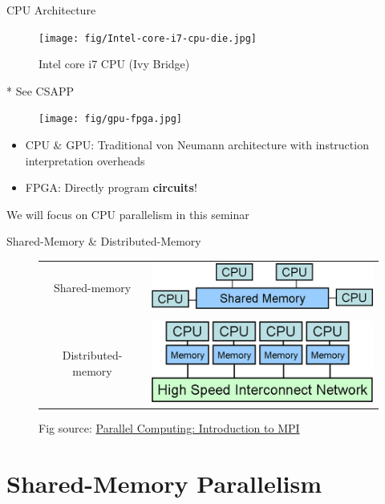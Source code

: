 \documentclass{../TexTemplate/myslide}
\begin{document}
\begin{frame}{CPU Architecture}
\begin{figure}
\centering
\texttt{[image: fig/Intel-core-i7-cpu-die.jpg]}
\caption*{\small Intel core i7 CPU (Ivy Bridge)}
\end{figure}
* See CSAPP
\end{frame}

\begin{frame}
\begin{figure}
\centering
\texttt{[image: fig/gpu-fpga.jpg]}
\end{figure}
\small
\begin{itemize}
\item CPU \& GPU: Traditional von Neumann architecture with instruction interpretation overheads
\item FPGA: Directly program \textbf{circuits}!
\end{itemize}
\pause
We will focus on CPU parallelism in this seminar
\end{frame}

\begin{frame}{Shared-Memory \& Distributed-Memory}
\begin{figure}[H]
\centering
\begin{tabular}{cc}
Shared-memory & \includegraphics[width=0.5\linewidth]{fig/shared-memory-model.png}\\
\quad & \quad\\
Distributed-memory & \includegraphics[width=0.5\linewidth]{fig/distributed_memory_model.png}
\end{tabular}
\caption*{\small Fig source: \href{https://bioinfomagician.wordpress.com/2013/11/11/parallel-computing-introduction-to-mpi/}{Parallel Computing: Introduction to MPI}}
\end{figure}
\end{frame}

\section{Shared-Memory Parallelism}
\begin{frame}
\sectionpage
\end{frame}
\end{document}
